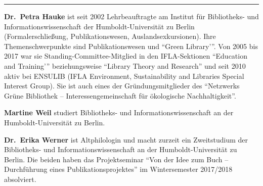 \begin{center}\rule{0.5\linewidth}{\linethickness}\end{center}

\textbf{Dr.~Petra Hauke} ist seit 2002 Lehrbeauftragte am Institut für
Bibliotheks- und Informationswissenschaft der Humboldt-Universität zu
Berlin (Formalerschließung, Publikationswesen, Auslandsexkursionen).
Ihre Themenschwerpunkte sind Publikationswesen und \enquote{Green Library'}.
Von 2005 bis 2017 war sie Standing-Committee-Mitglied in den
IFLA-Sektionen \enquote{Education and Training'} beziehungsweise \enquote{Library
Theory and Research} und seit 2010 aktiv bei ENSULIB (IFLA Environment,
Sustainability and Libraries Special Interest Group). Sie ist auch eines
der Gründungsmitglieder des \enquote{Netzwerks Grüne Bibliothek --
Interessengemeinschaft für ökologische Nachhaltigkeit}.

\textbf{Martine Weil} studiert Bibliotheks- und Informationswissenschaft
an der Humboldt-Universität zu Berlin.

\textbf{Dr.~Erika Werner} ist Altphilologin und macht zurzeit ein
Zweitstudium der Bibliotheks- und Informationswissenschaft an der
Humboldt-Universität zu Berlin. Die beiden haben das Projektseminar
\enquote{Von der Idee zum Buch -- Durchführung eines Publikationsprojektes} im
Wintersemester 2017/2018 absolviert.
